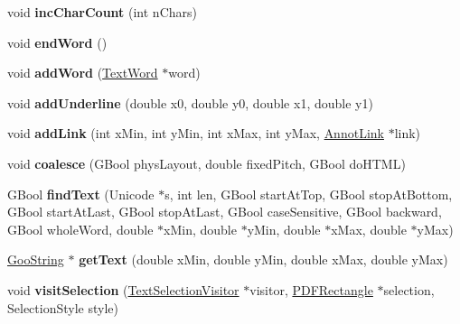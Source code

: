 \begin{DoxyCompactItemize}
void {\bfseries inc\+Char\+Count} (int n\+Chars)
\item 
\mbox{\label{class_text_page_a6453a3aebb50911d16f6d3fc30397598}} 
void {\bfseries end\+Word} ()
\item 
\mbox{\label{class_text_page_a7d4eed83a4e2d0b13caf852a76d0cddc}} 
void {\bfseries add\+Word} (\hyperlink{class_text_word}{Text\+Word} $\ast$word)
\item 
\mbox{\label{class_text_page_a7d3af738550aff90faae103c9c909ebf}} 
void {\bfseries add\+Underline} (double x0, double y0, double x1, double y1)
\item 
\mbox{\label{class_text_page_aa50f988cb47273595ec1b1554ec30331}} 
void {\bfseries add\+Link} (int x\+Min, int y\+Min, int x\+Max, int y\+Max, \hyperlink{class_annot_link}{Annot\+Link} $\ast$link)
\item 
\mbox{\label{class_text_page_a5ed0ef54c8a2d820578b30256f55e0f8}} 
void {\bfseries coalesce} (G\+Bool phys\+Layout, double fixed\+Pitch, G\+Bool do\+H\+T\+ML)
\item 
\mbox{\label{class_text_page_ad83d944024b429c426f186b179b4c368}} 
G\+Bool {\bfseries find\+Text} (Unicode $\ast$s, int len, G\+Bool start\+At\+Top, G\+Bool stop\+At\+Bottom, G\+Bool start\+At\+Last, G\+Bool stop\+At\+Last, G\+Bool case\+Sensitive, G\+Bool backward, G\+Bool whole\+Word, double $\ast$x\+Min, double $\ast$y\+Min, double $\ast$x\+Max, double $\ast$y\+Max)
\item 
\mbox{\label{class_text_page_a0c50d64a5bc5bcd43a01a4c244c8056f}} 
\hyperlink{class_goo_string}{Goo\+String} $\ast$ {\bfseries get\+Text} (double x\+Min, double y\+Min, double x\+Max, double y\+Max)
\item 
\mbox{\label{class_text_page_a6575606dbd27c2b31ef6acbd1c4fb105}} 
void {\bfseries visit\+Selection} (\hyperlink{class_text_selection_visitor}{Text\+Selection\+Visitor} $\ast$visitor, \hyperlink{class_p_d_f_rectangle}{P\+D\+F\+Rectangle} $\ast$selection, Selection\+Style style)
\item 
\mbox{\label{class_text_page_a9f71e9652fb53e4403cdb583e8239981}} 

\end{DoxyCompactItemize}
